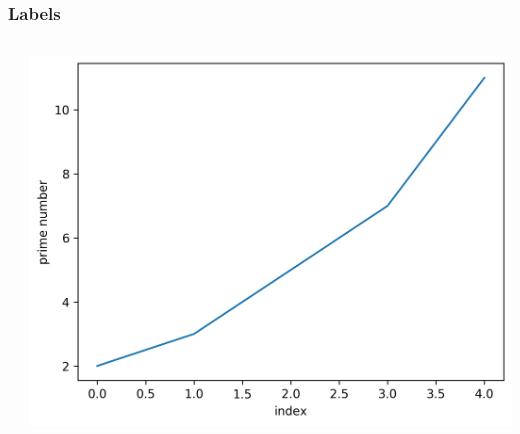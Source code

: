 \documentclass[xcolor={svgnames}]{beamer}
\newcommand{\pyfile}[2][]{}
\begin{document}
\begin{frame}[t,fragile]
    \frametitle{Labels}
    \vspace{5mm}
    \begin{columns}[T]
        \begin{column}{0.52\textwidth}
            \pyfile{examples/04-labels.py}
        \end{column}
        \begin{column}{0.48\textwidth}
            \includegraphics[width=\textwidth]{img/04-labels.png}
        \end{column}
    \end{columns}
\end{frame}
\end{document}
